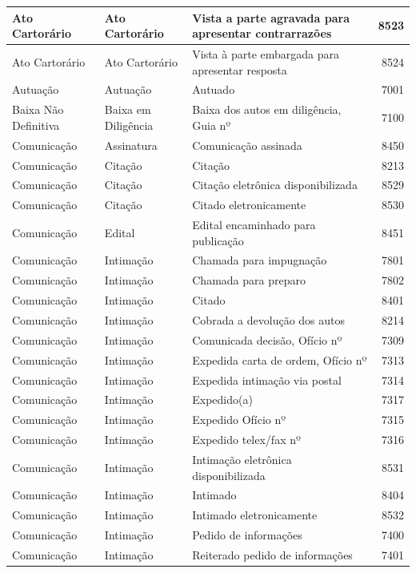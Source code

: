 \documentclass[
]{book}
\begin{document}
\begin{tabular}{l|l|l|r}
\hline
Ato Cartorário & Ato Cartorário & Vista a parte agravada para apresentar contrarrazões & 8523\\
\hline
Ato Cartorário & Ato Cartorário & Vista à parte embargada para apresentar resposta & 8524\\
\hline
Autuação & Autuação & Autuado & 7001\\
\hline
Baixa Não Definitiva & Baixa em Diligência & Baixa dos autos em diligência, Guia nº & 7100\\
\hline
Comunicação & Assinatura & Comunicação assinada & 8450\\
\hline
Comunicação & Citação & Citação & 8213\\
\hline
Comunicação & Citação & Citação eletrônica disponibilizada & 8529\\
\hline
Comunicação & Citação & Citado eletronicamente & 8530\\
\hline
Comunicação & Edital & Edital encaminhado para publicação & 8451\\
\hline
Comunicação & Intimação & Chamada para impugnação & 7801\\
\hline
Comunicação & Intimação & Chamada para preparo & 7802\\
\hline
Comunicação & Intimação & Citado & 8401\\
\hline
Comunicação & Intimação & Cobrada a devolução dos autos & 8214\\
\hline
Comunicação & Intimação & Comunicada decisão, Ofício nº & 7309\\
\hline
Comunicação & Intimação & Expedida carta de ordem, Ofício nº & 7313\\
\hline
Comunicação & Intimação & Expedida intimação via postal & 7314\\
\hline
Comunicação & Intimação & Expedido(a) & 7317\\
\hline
Comunicação & Intimação & Expedido Ofício nº & 7315\\
\hline
Comunicação & Intimação & Expedido telex/fax nº & 7316\\
\hline
Comunicação & Intimação & Intimação eletrônica disponibilizada & 8531\\
\hline
Comunicação & Intimação & Intimado & 8404\\
\hline
Comunicação & Intimação & Intimado eletronicamente & 8532\\
\hline
Comunicação & Intimação & Pedido de informações & 7400\\
\hline
Comunicação & Intimação & Reiterado pedido de informações & 7401\\

\end{tabular}
\end{document}
